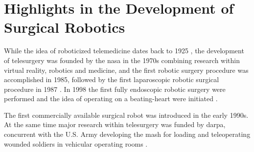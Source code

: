 \section{Highlights in the Development of Surgical Robotics}

\vspace{-1mm}
While the idea of roboticized telemedicine dates back to 1925 \citep{bib:telemed_predict}, the development of telesurgery was founded by the \gls{nasa} in the 1970s %
combining research within virtual reality, robotics and medicine, %
and the first robotic surgery procedure was accomplished in 1985, %
followed by the first laparoscopic robotic surgical procedure in 1987 \citep{bib:telesurg_history,bib:brown_univ}.
In 1998 the first fully endoscopic robotic surgery were performed and the idea of operating on a beating-heart were initiated \citep{bib:brown_univ}. 



The first commercially available surgical robot was introduced in the early 1990s. At the same time major research within telesurgery was funded by \gls{darpa}, %
concurrent with the U.S. Army developing the \gls{mash} for loading and teleoperating wounded soldiers in vehicular operating rooms \citep{bib:telesurg_history,bib:brown_univ}.


